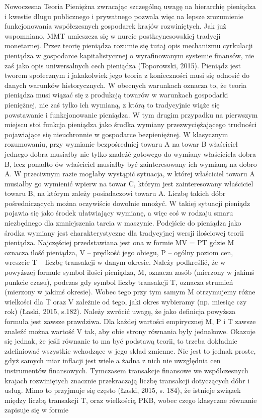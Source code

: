 \documentclass[
]{book}
\begin{document}
Nowoczesna Teoria Pieniężna zwracając szczególną uwagę na hierarchię pieniądza i kwestie długu publicznego i prywatnego pozwala więc na lepsze zrozumienie funkcjonowania współczesnych gospodarek krajów rozwiniętych.
Jak już wspomniano, MMT umieszcza się w nurcie postkeynesowskiej tradycji monetarnej. Przez teorię pieniądza rozumie się tutaj opis mechanizmu cyrkulacji pieniądza w gospodarce kapitalistycznej o wyrafinowanym systemie finansów, nie zaś jako opis uniwersalnych cech pieniądza (Toporowski, 2015). Pieniądz jest tworem społecznym i jakakolwiek jego teoria z konieczności musi się odnosić do danych warunków historycznych. W obecnych warunkach oznacza to, że teoria pieniądza musi wiązać się z produkcją towarów w warunkach gospodarki pieniężnej, nie zaś tylko ich wymianą, z którą to tradycyjnie wiąże się powstawanie i funkcjonowanie pieniądza. W tym drugim przypadku na pierwszym miejscu stoi funkcja pieniądza jako środka wymiany przezwyciężającego trudności pojawiające się nieuchronnie w gospodarce bezpieniężnej.
W klasycznym rozumowaniu, przy wymianie bezpośredniej towaru A na towar B właściciel jednego dobra musiałby nie tylko znaleźć gotowego do wymiany właściciela dobra B, lecz ponadto ów właściciel musiałby być zainteresowany ich wymianą na dobro A. W przeciwnym razie mogłaby wystąpić sytuacja, w której właściciel towaru A musiałby go wymienić wpierw na towar C, którym jest zainteresowany właściciel towaru B, na którym zależy posiadaczowi towaru A. Liczbę takich dóbr pośredniczących można oczywiście dowolnie mnożyć. W takiej sytuacji pieniądz pojawia się jako środek ułatwiający wymianę, a więc coś w rodzaju smaru niezbędnego dla zmniejszenia tarcia w maszynie.
Podejście do pieniądza jako środka wymiany jest charakterystyczne dla tradycyjnej wersji ilościowej teorii pieniądza. Najczęściej przedstawiana jest ona w formie
MV = PT
gdzie M oznacza ilość pieniądza, V -- prędkość jego obiegu, P -- ogólny poziom cen, wreszcie T -- liczbę transakcji w danym okresie. Należy podkreślić, że w powyższej formule symbol ilości pieniądza, M, oznacza zasób (mierzony w jakimś punkcie czasu), podczas gdy symbol liczby transakcji T, oznacza strumień (mierzony w jakimś okresie). Wobec tego przy tym samym M otrzymujemy różne wielkości dla T oraz V zależnie od tego, jaki okres wybieramy (np. miesiąc czy rok) (Łaski, 2015, s.182).
Należy zwrócić uwagę, że jako definicja powyższa formuła jest zawsze prawdziwa. Dla każdej wartości empirycznej M, P i T zawsze znaleźć można wartość V tak, aby obie strony równania były jednakowe. Okazuje się jednak, że jeśli równanie to ma być podstawą teorii, to trzeba dokładnie zdefiniować wszystkie wchodzące w jego skład zmienne. Nie jest to jednak proste, gdyż samych miar inflacji jest wiele a żadna z nich nie uwzględnia cen instrumentów finansowych. Tymczasem transakcje finansowe we współczesnych krajach rozwiniętych znacznie przekraczają liczbę transakcji dotyczących dóbr i usług. Mimo to przyjmuje się często (Łaski, 2015, s. 184), że istnieje związek między liczbą transakcji T, oraz wielkością PKB, wobec czego klasyczne równanie zapisuje się w formie
\end{document}
